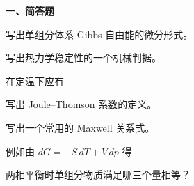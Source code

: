 ﻿


\textbf{一、简答题}
\begin{question}
写出单组分体系 Gibbs 自由能的微分形式。
\begin{solution}

\end{solution}
\end{question}

\begin{question}
写出热力学稳定性的一个机械判据。
\begin{solution}

在定温下应有
\end{solution}
\end{question}

\begin{question}
写出 Joule--Thomson 系数的定义。
\begin{solution}

\end{solution}
\end{question}

\begin{question}
写出一个常用的 Maxwell 关系式。
\begin{solution}

例如由 $dG=-S\,dT+V\,dp$ 得
\end{solution}
\end{question}

\begin{question}
两相平衡时单组分物质满足哪三个量相等？
\begin{solution}

\end{solution}
\end{question}

